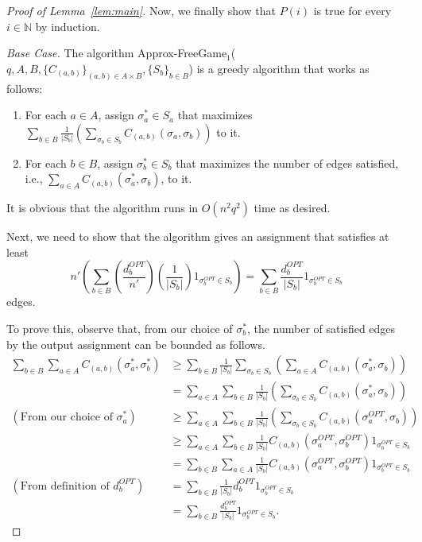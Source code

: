 \documentclass{article}
\begin{document}
\begin{proof}[Proof of Lemma~\ref{lem:main}]
Now, we finally show that $P(i)$ is true for every $i \in \mathbb{N}$ by induction.

{\em Base Case.} The algorithm {\sc Approx-FreeGame$_1$}($q, A, B, \{C_{(a, b)}\}_{(a, b) \in A \times B}, \{S_b\}_{b \in B}$) is a greedy algorithm that works as follows:
\begin{enumerate}
  \item For each $a \in A$, assign $\sigma^*_a \in S_a$ that maximizes $\sum_{b \in B} \frac{1}{|S_b|}\left(\sum_{\sigma_b \in S_b} C_{(a, b)}(\sigma_a, \sigma_b)\right)$ to it. \label{step:free-greedy}
  \item For each $b \in B$, assign $\sigma^*_b \in S_b$ that maximizes the number of edges satisfied, i.e., $\sum_{a \in A} C_{(a, b)}(\sigma^*_a, \sigma_b)$, to it.
\end{enumerate}

It is obvious that the algorithm runs in $O(n^2q^2)$ time as desired.

Next, we need to show that the algorithm gives an assignment that satisfies at least $$n'\left(\sum_{b \in B} \left(\frac{d^{OPT}_b}{n'}\right)\left(\frac{1}{|S_b|}\right)1_{\sigma_b^{OPT} \in S_b}\right) = \sum_{b \in B} \frac{d^{OPT}_b}{|S_b|}1_{\sigma_b^{OPT} \in S_b}$$ edges.

To prove this, observe that, from our choice of $\sigma^*_b$, the number of satisfied edges by the output assignment can be bounded as follows.
\begin{align*}
  \sum_{b \in B} \sum_{a \in A} C_{(a, b)}(\sigma^*_a, \sigma^*_b) &\geq \sum_{b \in B} \frac{1}{|S_b|} \sum_{\sigma_b \in S_b} \left(\sum_{a \in A} C_{(a, b)}(\sigma^*_a, \sigma_b)\right) \\
  &= \sum_{a \in A} \sum_{b \in B} \frac{1}{|S_b|} \left(\sum_{\sigma_b \in S_b} C_{(a, b)}(\sigma^*_a, \sigma_b)\right) \\
  (\text{From our choice of } \sigma_a^*) &\geq \sum_{a \in A} \sum_{b \in B} \frac{1}{|S_b|} \left(\sum_{\sigma_b \in S_b} C_{(a, b)}(\sigma^{OPT}_a, \sigma_b)\right) \\
  &\geq \sum_{a \in A} \sum_{b \in B} \frac{1}{|S_b|} C_{(a, b)}(\sigma^{OPT}_a, \sigma^{OPT}_b) 1_{\sigma_b^{OPT} \in S_b} \\
  &= \sum_{b \in B} \sum_{a \in A} \frac{1}{|S_b|} C_{(a, b)}(\sigma^{OPT}_a, \sigma^{OPT}_b) 1_{\sigma_b^{OPT} \in S_b} \\
  (\text{From definition of } d^{OPT}_b)&= \sum_{b \in B} \frac{1}{|S_b|} d^{OPT}_b 1_{\sigma_b^{OPT} \in S_b} \\
  &= \sum_{b \in B} \frac{d^{OPT}_b}{|S_b|} 1_{\sigma_b^{OPT} \in S_b}.
\end{align*}


\end{proof}
\end{document}

